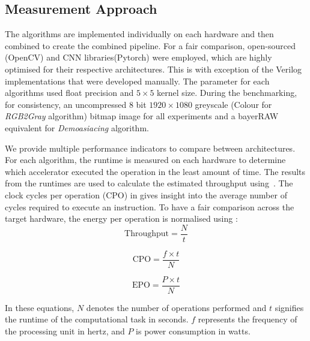 \subsection{Measurement Approach}\label{sec:measurementApproach}
The algorithms are implemented individually on each hardware and then combined to create the combined pipeline. For a fair comparison, open-sourced (OpenCV) and CNN libraries(Pytorch) were employed, which are highly optimised for their respective architectures. This is with exception of the Verilog implementations that were developed manually. The parameter for each algorithms used float precision and $5\times5$ kernel size. During the benchmarking, for consistency, an uncompressed $8$ bit $1920 \times 1080$ greyscale (Colour for \textit{RGB2Gray} algorithm) bitmap image for all experiments and a bayerRAW equivalent for \textit{Demoasiacing} algorithm.

We provide multiple performance indicators to compare between architectures. For each algorithm, the runtime is measured on each hardware to determine which accelerator executed the operation in the least amount of time. The results from the runtimes are used to calculate the estimated throughput using~. The clock cycles per operation (CPO) in  gives insight into the average number of cycles required to execute an instruction. To have a fair comparison across the target hardware, the energy per operation is normalised using :
\begin{equation}
\text{Throughput} = \frac{N}{t} \label{eq:flop}
\end{equation}

\begin{equation}
\text{CPO} = \frac{f \times t}{N} \label{eq:ClockComplete}
\end{equation}

\begin{equation}
\text{EPO} = \frac{P \times t}{N} \label{eq:energyepo}
\end{equation}

In these equations, $N$ denotes the number of operations performed and  $t$ signifies the runtime of the computational task in seconds. $f$ represents the frequency of the processing unit in hertz, and $P$ is power consumption in watts.





